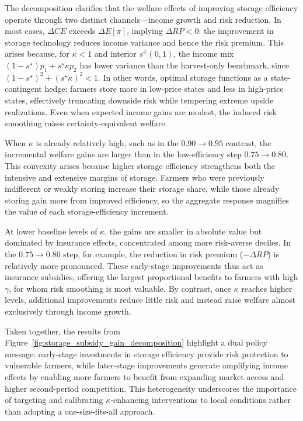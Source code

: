 The decomposition clarifies that the welfare effects of improving storage efficiency operate through two distinct channels---income growth and risk reduction. In most cases, $\Delta CE$ exceeds $\Delta E[\pi]$, implying $\Delta RP<0$: the improvement in storage technology reduces income variance and hence the risk premium. This arises because, for $\kappa<1$ and interior $s^\in(0,1)$, the income mix $(1-s^\star)p_1 + s^\star\kappa p_2$ has lower variance than the harvest-only benchmark, since $(1-s^\star)^2 + (s^\star\kappa)^2 < 1$. In other words, optimal storage functions as a state-contingent hedge: farmers store more in low-price states and less in high-price states, effectively truncating downside risk while tempering extreme upside realizations. Even when expected income gains are modest, the induced risk smoothing raises certainty-equivalent welfare.

When $\kappa$ is already relatively high, such as in the $0.90 \rightarrow 0.95$ contrast, the incremental welfare gains are larger than in the low-efficiency step $0.75 \rightarrow 0.80$. This convexity arises because higher storage efficiency strengthens both the intensive and extensive margins of storage. Farmers who were previously indifferent or weakly storing increase their storage share, while those already storing gain more from improved efficiency, so the aggregate response magnifies the value of each storage-efficiency increment.

At lower baseline levels of $\kappa$, the gains are smaller in absolute value but dominated by insurance effects, concentrated among more risk-averse deciles. In the $0.75 \rightarrow 0.80$ step, for example, the reduction in risk premium ($- \Delta RP$) is relatively more pronounced. These early-stage improvements thus act as insurance subsidies, offering the largest proportional benefits to farmers with high $\gamma$, for whom risk smoothing is most valuable. By contrast, once $\kappa$ reaches higher levels, additional improvements reduce little risk and instead raise welfare almost exclusively through income growth. 

Taken together, the results from Figure~\ref{fig:storage_subsidy_gain_decomposition} highlight a dual policy message: early-stage investments in storage efficiency provide risk protection to vulnerable farmers, while later-stage improvements generate amplifying income effects by enabling more farmers to benefit from expanding market access and higher second-period competition. This heterogeneity underscores the importance of targeting and calibrating $\kappa$-enhancing interventions to local conditions rather than adopting a one-size-fits-all approach. 




